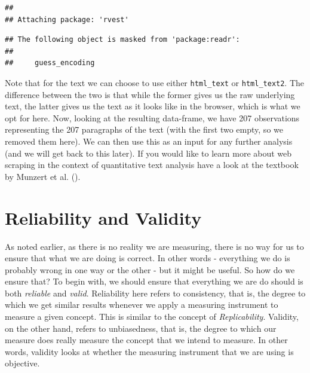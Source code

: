 \documentclass[
]{book}
\newenvironment{Shaded}{\begin{snugshade}}{\end{snugshade}}
\newcommand{\DecValTok}[1]{\textcolor[rgb]{0.00,0.00,0.81}{#1}}
\newcommand{\FunctionTok}[1]{\textcolor[rgb]{0.13,0.29,0.53}{\textbf{#1}}}
\newcommand{\NormalTok}[1]{#1}
\newcommand{\OtherTok}[1]{\textcolor[rgb]{0.56,0.35,0.01}{#1}}
\newcommand{\SpecialCharTok}[1]{\textcolor[rgb]{0.81,0.36,0.00}{\textbf{#1}}}
\newcommand{\StringTok}[1]{\textcolor[rgb]{0.31,0.60,0.02}{#1}}
\begin{document}
\begin{verbatim}
## 
## Attaching package: 'rvest'
\end{verbatim}

\begin{verbatim}
## The following object is masked from 'package:readr':
## 
##     guess_encoding
\end{verbatim}

\begin{Shaded}
\end{Shaded}

Note that for the text we can choose to use either \texttt{html\_text} or \texttt{html\_text2}. The difference between the two is that while the former gives us the raw underlying text, the latter gives us the text as it looks like in the browser, which is what we opt for here. Now, looking at the resulting data-frame, we have 207 observations representing the 207 paragraphs of the text (with the first two empty, so we removed them here). We can then use this as an input for any further analysis (and we will get back to this later). If you would like to learn more about web scraping in the context of quantitative text analysis have a look at the textbook by Munzert et al. ().

\chapter{Reliability and Validity}\label{reliability-validity}

As noted earlier, as there is no reality we are measuring, there is no way for us to ensure that what we are doing is correct. In other words - everything we do is probably wrong in one way or the other - but it might be useful. So how do we ensure that? To begin with, we should ensure that everything we are do should is both \emph{reliable} and \emph{valid}. Reliability here refers to consistency, that is, the degree to which we get similar results whenever we apply a measuring instrument to measure a given concept. This is similar to the concept of \emph{Replicability}. Validity, on the other hand, refers to unbiasedness, that is, the degree to which our measure does really measure the concept that we intend to measure. In other words, validity looks at whether the measuring instrument that we are using is objective.
\end{document}

